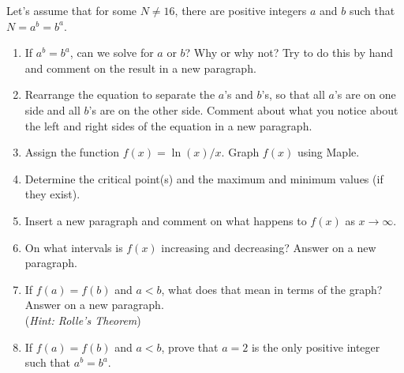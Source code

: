 Let's assume that for some $N \not = 16$, there are positive integers $a$ and $b$ such that $N = a^b = b^a$.

\begin{enumerate}
    \item   If $a^b = b^a$, can we solve for $a$ or $b$?  Why or why not?  Try to do this by hand and comment on the result in a new paragraph.
    \item   Rearrange the equation to separate the $a$'s and $b$'s, so that all $a$'s are on one side and all $b$'s are on the other side. Comment about what you notice about the left and right sides of the equation in a new paragraph.
    \item   Assign the function $f(x) = \ln(x)/x$.  Graph $f(x)$ using Maple.
    \item   Determine the critical point(s) and the maximum and minimum values (if they exist).
    \item   Insert a new paragraph and comment on what happens to $f(x)$ as $x \rightarrow \infty$.
    \item   On what intervals is $f(x)$ increasing and decreasing? Answer on a new paragraph.
    \item   If $f(a) = f(b)$ and $a < b$, what does that mean in terms of the graph? Answer on a new paragraph. \\(\textit{Hint: Rolle's Theorem})
    \item   If $f(a) = f(b)$ and $a < b$, prove that $a = 2$ is the only positive integer such that $a^b = b^a$.
\end{enumerate}